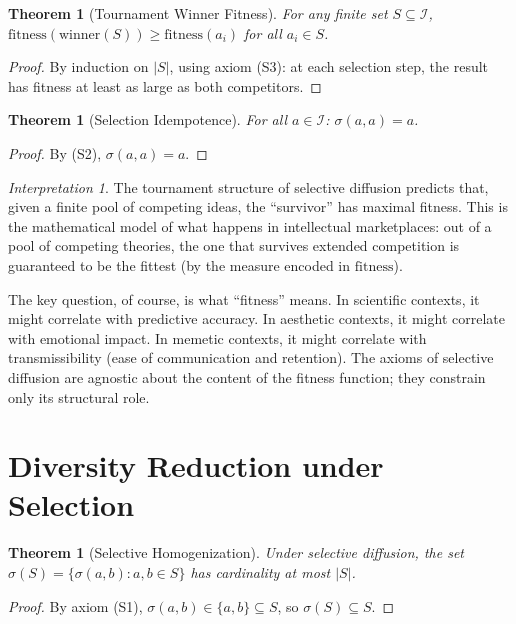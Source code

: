 \documentclass[11pt,openany]{book}
\theoremstyle{definition}
\theoremstyle{plain}
\newtheorem{theorem}[axiom]{Theorem}
\theoremstyle{remark}
\newtheorem{interpretation}[axiom]{Interpretation}
\newcommand{\IS}{\mathcal{I}}               %
\begin{document}
\begin{theorem}[Tournament Winner Fitness]
For any finite set $S \subseteq \IS$, $\mathrm{fitness}(\mathrm{winner}(S)) \geq \mathrm{fitness}(a_i)$ for all $a_i \in S$.
\end{theorem}

\begin{proof}
By induction on $|S|$, using axiom (S3): at each selection step, the result has fitness at least as large as both competitors.
\end{proof}

\begin{theorem}[Selection Idempotence]
For all $a \in \IS$: $\sigma(a, a) = a$.
\end{theorem}

\begin{proof}
By (S2), $\sigma(a, a) = a$.
\end{proof}

\begin{interpretation}
The tournament structure of selective diffusion predicts that, given a finite pool of competing ideas, the ``survivor'' has maximal fitness. This is the mathematical model of what happens in intellectual marketplaces: out of a pool of competing theories, the one that survives extended competition is guaranteed to be the fittest (by the measure encoded in $\mathrm{fitness}$).

The key question, of course, is what ``fitness'' means. In scientific contexts, it might correlate with predictive accuracy. In aesthetic contexts, it might correlate with emotional impact. In memetic contexts, it might correlate with transmissibility (ease of communication and retention). The axioms of selective diffusion are agnostic about the content of the fitness function; they constrain only its structural role.
\end{interpretation}

\section{Diversity Reduction under Selection}

\begin{theorem}[Selective Homogenization]
\label{thm:homogenization}
Under selective diffusion, the set $\sigma(S) = \{\sigma(a, b) : a, b \in S\}$ has cardinality at most $|S|$.
\end{theorem}

\begin{proof}
By axiom (S1), $\sigma(a, b) \in \{a, b\} \subseteq S$, so $\sigma(S) \subseteq S$.
\end{proof}
\end{document}
